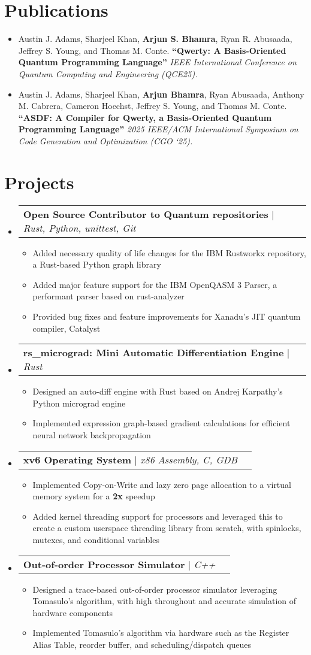 \documentclass[letterpaper,11pt]{article}
\makeatletter
\newcommand{\resumeItem}[1]{
  \item\small{
    {#1 \vspace{-1pt}}
  }
}
\newcommand{\resumeProjectHeading}[2]{
    \item
    \begin{tabular*}{0.97\textwidth}{l@{\extracolsep{\fill}}r}
      \small#1 & #2 \\
    \end{tabular*}\vspace{-7pt}
}
\newcommand{\resumeSubHeadingListStart}{\begin{itemize}[leftmargin=0.15in, label={}]}
\newcommand{\resumeSubHeadingListEnd}{\end{itemize}}
\newcommand{\resumeItemListStart}{\begin{itemize}}
\newcommand{\resumeItemListEnd}{\end{itemize}\vspace{-5pt}}
\makeatother
\begin{document}
\section{Publications}
    \resumeSubHeadingListStart
      \resumeItem{Austin J. Adams, Sharjeel Khan, \textbf{Arjun S. Bhamra}, Ryan R. Abusaada, Jeffrey S. Young, and Thomas M. Conte. \textbf{“Qwerty: A Basis-Oriented Quantum Programming Language”} \textit{IEEE International Conference on Quantum Computing and Engineering (QCE25).}}
      \resumeItem{Austin J. Adams, Sharjeel Khan, \textbf{Arjun Bhamra}, Ryan Abusaada, Anthony M. Cabrera, Cameron Hoechst, Jeffrey S. Young, and Thomas M. Conte. \textbf{“ASDF: A Compiler for Qwerty, a Basis-Oriented Quantum Programming Language”} \textit{2025 IEEE/ACM International Symposium on Code Generation and Optimization (CGO ‘25).}}
    \resumeSubHeadingListEnd

\section{Projects}
    \resumeSubHeadingListStart

     \resumeProjectHeading{\textbf{Open Source Contributor to Quantum repositories} $|$ \emph{Rust, Python, unittest, Git}}{}
          \resumeItemListStart
            \resumeItem{Added necessary quality of life changes for the IBM Rustworkx repository, a Rust-based Python graph library}
            \resumeItem{Added major feature support for the IBM OpenQASM 3 Parser, a performant parser based on rust-analyzer}
            \resumeItem{Provided bug fixes and feature improvements for Xanadu's JIT quantum compiler, Catalyst}
          \resumeItemListEnd
          \resumeProjectHeading{\textbf{rs\_micrograd: Mini Automatic Differentiation Engine} $|$ \emph{Rust}}{}
          \resumeItemListStart
            \resumeItem{Designed an auto-diff engine with Rust based on Andrej Karpathy's Python micrograd engine}
            \resumeItem{Implemented expression graph-based gradient calculations for efficient neural network backpropagation}
          \resumeItemListEnd
          \resumeProjectHeading{\textbf{xv6 Operating System} $|$ \emph{x86 Assembly, C, GDB}}{}
          \resumeItemListStart
            \resumeItem{Implemented Copy-on-Write and lazy zero page allocation to a virtual memory system for a \textbf{2x} speedup}
            \resumeItem{Added kernel threading support for processors and leveraged this to create a custom userspace threading library from scratch, with spinlocks, mutexes, and conditional variables}
          \resumeItemListEnd
          \resumeProjectHeading{\textbf{Out-of-order Processor Simulator} $|$ \emph{C++}}{}
          \resumeItemListStart
            \resumeItem{Designed a trace-based out-of-order processor simulator leveraging Tomasulo's algorithm, with high throughout and accurate simulation of hardware components}
            \resumeItem{Implemented Tomasulo's algorithm via hardware such as the Register Alias Table, reorder buffer, and scheduling/dispatch queues}
          \resumeItemListEnd
    \resumeSubHeadingListEnd
\end{document}
